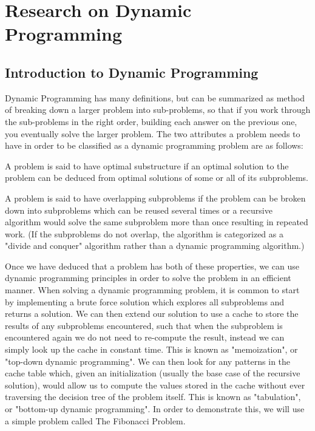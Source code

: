 \chapter{Research on Dynamic Programming}

\section{Introduction to Dynamic Programming}
Dynamic Programming has many definitions, but can be summarized as method of breaking down a larger problem into sub-problems, so that if you work through the sub-problems in the right order, building each answer on the previous one, you eventually solve the larger problem.
The two attributes a problem needs to have in order to be classified as a dynamic programming problem are as follows:

\begin{definition}
    A problem is said to have optimal substructure if an optimal solution to the problem can be deduced from optimal solutions of some or all of its subproblems.
\end{definition}

\begin{definition}
    A problem is said to have overlapping subproblems if the problem can be broken down into subproblems which can be reused several times or a recursive algorithm would solve the same subproblem more than once resulting in repeated work. (If the subproblems do not overlap, the algorithm is categorized as a "divide and conquer" algorithm rather than a dynamic programming algorithm.)
\end{definition} 
Once we have deduced that a problem has both of these properties, we can use dynamic programming principles in order to solve the problem in an efficient manner.
When solving a dynamic programming problem, it is common to start by implementing a brute force solution which explores all subproblems and returns a solution.
We can then extend our solution to use a cache to store the results of any subproblems encountered, such that when the subproblem is encountered again we do not need to re-compute the result, instead we can simply look up the cache in constant time.
This is known as "memoization", or "top-down dynamic programming".
We can then look for any patterns in the cache table which, given an initialization (usually the base case of the recursive solution), would allow us to compute the values stored in the cache without ever traversing the decision tree of the problem itself.
This is known as "tabulation", or "bottom-up dynamic programming".
In order to demonstrate this, we will use a simple problem called The Fibonacci Problem.

